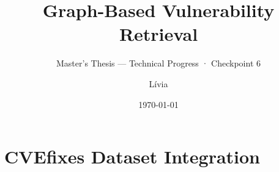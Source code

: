 \documentclass[aspectratio=169,10pt]{beamer}
\title{\textbf{Graph-Based Vulnerability Retrieval}\\[4pt]}
\subtitle{Master's Thesis — Technical Progress · Checkpoint 6}
\author{Lívia}
\institute{TU Munich · Siemens}
\date{\today}
\begin{document}
\begin{frame}
\titlepage
\end{frame}








\section{CVEfixes Dataset Integration}
\end{document}

